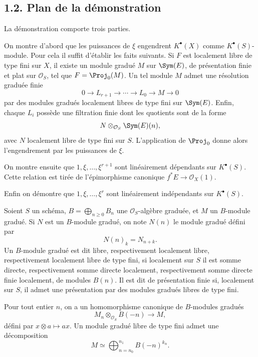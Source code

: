 \documentclass[11pt]{article}
\begin{document}
\subsection*{1.2. Plan de la démonstration}
La démonstration comporte trois parties.

On montre d'abord que les puissances de \(\xi\) engendrent \(K^\bullet(X)\) comme \(K^\bullet(S)\)-module. Pour cela il suffit d'établir les faits suivants. Si \(F\) est localement libre de type fini sur \(X\), il existe un module gradué \(M\) sur \(\Sym(E)\), de présentation finie et plat sur \(\mathcal O_S\), tel que \(F=\Proj_0(M)\). Un tel module \(M\) admet une résolution graduée finie
\[
  0\longrightarrow L_{r+1}\longrightarrow \cdots \longrightarrow L_0\longrightarrow M\longrightarrow 0
\]
par des modules gradués localement libres de type fini sur \(\Sym(E)\). Enfin, chaque \(L_i\) possède une filtration finie dont les quotients sont de la forme
\[
  N\otimes_{\mathcal O_S}\Sym(E)(n),
\]
avec \(N\) localement libre de type fini sur \(S\). L'application de \(\Proj_0\) donne alors l'engendrement par les puissances de \(\xi\).

On montre ensuite que \(1,\xi,\ldots,\xi^{r+1}\) sont linéairement dépendants sur \(K^\bullet(S)\). Cette relation est tirée de l'épimorphisme canonique \(f^*E\to\mathcal O_X(1)\).

Enfin on démontre que \(1,\xi,\ldots,\xi^r\) sont linéairement indépendants sur \(K^\bullet(S)\).

Soient \(S\) un schéma, \(B=\bigoplus_{n\geq0}B_n\) une \(\mathcal O_S\)-algèbre graduée, et \(M\) un \(B\)-module gradué. Si \(N\) est un \(B\)-module gradué, on note \(N(n)\) le module gradué défini par
\[
  N(n)_k=N_{n+k}.
\]
Un \(B\)-module gradué est dit libre, respectivement localement libre, respectivement localement libre de type fini, si localement sur \(S\) il est somme directe, respectivement somme directe localement, respectivement somme directe finie localement, de modules \(B(n)\). Il est dit de présentation finie si, localement sur \(S\), il admet une présentation par des modules gradués libres de type fini.

Pour tout entier \(n\), on a un homomorphisme canonique de \(B\)-modules gradués
\begin{equation}\tag{1.2.1}
  M_n\otimes_{\mathcal O_S}B(-n)\longrightarrow M,
\end{equation}
défini par \(x\otimes a\mapsto ax\). Un module gradué libre de type fini admet une décomposition
\begin{equation}\tag{1.2.2}
  M\simeq \bigoplus_{n=n_0}^{n_1}B(-n)^{k_n}.
\end{equation}
\end{document}
